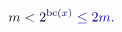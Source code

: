 \documentclass[12pt]{article}
\begin{document}
\makeatletter
\renewcommand*{\@textcolor}[3]{%
  \protect\leavevmode
  \begingroup
    \color#1{#2}#3%
  \endgroup
}
\makeatother
\begin{displaymath}
\mathcolor[RGB]{0,0,15}{m} \mathcolor[RGB]{0,0,30}{<} \mathcolor[RGB]{0,0,45}{2} ^ { \mathrm { \mathcolor[RGB]{0,0,60}{b} \mathcolor[RGB]{0,0,75}{c} } \mathcolor[RGB]{0,0,90}{(} \mathcolor[RGB]{0,0,105}{x} \mathcolor[RGB]{0,0,120}{)} } \mathcolor[RGB]{0,0,135}{\leq} \mathcolor[RGB]{0,0,150}{2} \mathcolor[RGB]{0,0,165}{m} \mathcolor[RGB]{0,0,180}{.}
\end{displaymath}
\end{document}
